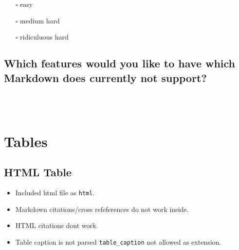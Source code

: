 \documentclass[
  british,
  12pt,
  paper=a4,
  twoside,
  titlepage=true,
  openright,
  abstract=on,
  toc=listofnumbered,
  numbers=noenddot,
  chapterprefix=true,
  headings=optiontohead,
  svgnames,
  dvipsnames]{scrreprt}
\providecommand{\tightlist}{%
  \setlength{\itemsep}{0pt}\setlength{\parskip}{0pt}}
\begin{document}
\begin{itemize}
\tightlist
\item[$\square$]
  easy
\item[$\square$]
  medium hard
\item[$\square$]
  ridiculuous hard
\end{itemize}

\hypertarget{which-features-would-you-like-to-have-which-markdown-does-currently-not-support}{%
\subsection*{Which features would you like to have which Markdown does
currently not
support?}\label{which-features-would-you-like-to-have-which-markdown-does-currently-not-support}}

\xhrule[,fill=1.0000\textwidth,thickness=0.5pt]\\
\xhrule[,fill=1.0000\textwidth,thickness=0.5pt]\\
\xhrule[,fill=1.0000\textwidth,thickness=0.5pt]

\hypertarget{tables}{%
\section{Tables}\label{tables}}

\hypertarget{html-table}{%
\subsection{HTML Table}\label{html-table}}

\begin{itemize}
\tightlist
\item
  Included html file as \texttt{html}.
\item
  Markdown citations/cross refeferences do not work inside.
\item
  HTML citations dont work.
\item
  Table caption is not parsed \texttt{table\_caption} not allowed as
  extension.
\end{itemize}
\end{document}
